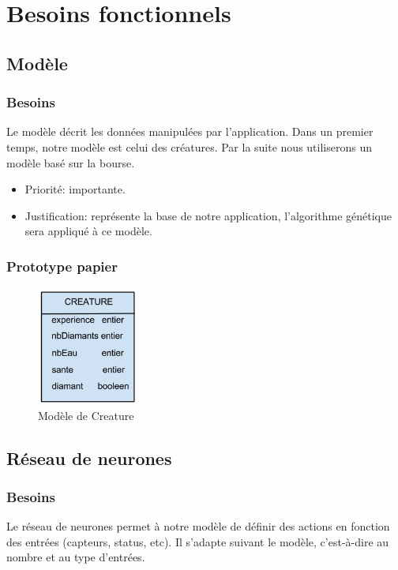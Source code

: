 \chapter{Besoins fonctionnels}

\section{Modèle}
\subsection{Besoins}
Le modèle décrit les données manipulées par l'application. Dans un premier temps, notre modèle est celui des créatures. Par la suite nous utiliserons un modèle basé sur la bourse.

\begin{itemize}
 \item Priorité: importante.
 \item Justification: représente la base de notre application, l'algorithme génétique sera appliqué à ce modèle.\\
\end{itemize}




\subsection{Prototype papier}

\begin{figure}[H]
    \centering
    \includegraphics[width=0.3\textwidth]{./pictures/creature.png}
    \caption{Modèle de Creature}
\end{figure}



\section{Réseau de neurones}
\subsection{Besoins}
Le réseau de neurones permet à notre modèle de définir des actions en fonction des entrées (capteurs, status, etc). Il s'adapte suivant le modèle, c'est-à-dire au nombre et au type d'entrées.

